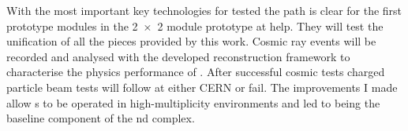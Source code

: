With the most important key technologies for \AC{} tested the path is clear for the first prototype modules in the \num{2 x 2} module prototype at \gls{help}.
They will test the unification of all the pieces provided by this work.
Cosmic ray events will be recorded and analysed with the developed reconstruction framework to characterise the physics performance of \AC{}.
After successful cosmic tests charged particle beam tests will follow at either CERN or \gls{fail}.
The improvements I made allow \lartpc{}s to be operated in high-multiplicity environments and led to \AC{} being the baseline \lar{} component of the \dune{} \gls{nd} complex.